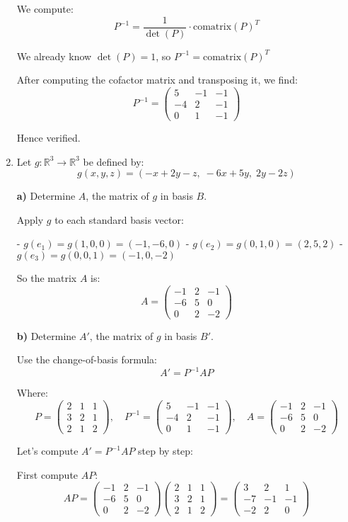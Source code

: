 \documentclass[12pt]{article}
\begin{document}
\begin{answerbox}
\begin{enumerate}
We compute:
$$
P^{-1} = \frac{1}{\det(P)} \cdot \text{comatrix}(P)^T
$$

We already know $\det(P) = 1$, so $P^{-1} = \text{comatrix}(P)^T$

After computing the cofactor matrix and transposing it, we find:
$$
P^{-1} = \begin{pmatrix}
5 & -1 & -1 \\
-4 & 2 & -1 \\
0 & 1 & -1
\end{pmatrix}
$$

Hence verified.

\item Let $g: \mathbb{R}^3 \to \mathbb{R}^3$ be defined by:
$$
g(x, y, z) = (-x + 2y - z,\; -6x + 5y,\; 2y - 2z)
$$

\textbf{a)} Determine $A$, the matrix of $g$ in basis $B$.

Apply $g$ to each standard basis vector:

- $g(e_1) = g(1,0,0) = (-1, -6, 0)$
- $g(e_2) = g(0,1,0) = (2, 5, 2)$
- $g(e_3) = g(0,0,1) = (-1, 0, -2)$

So the matrix $A$ is:
$$
A = \begin{pmatrix}
-1 & 2 & -1 \\
-6 & 5 & 0 \\
0 & 2 & -2
\end{pmatrix}
$$

\textbf{b)} Determine $A'$, the matrix of $g$ in basis $B'$.

Use the change-of-basis formula:
$$
A' = P^{-1} A P
$$

Where:
$$
P = \begin{pmatrix}
2 & 1 & 1 \\
3 & 2 & 1 \\
2 & 1 & 2
\end{pmatrix},\quad
P^{-1} = \begin{pmatrix}
5 & -1 & -1 \\
-4 & 2 & -1 \\
0 & 1 & -1
\end{pmatrix},\quad
A = \begin{pmatrix}
-1 & 2 & -1 \\
-6 & 5 & 0 \\
0 & 2 & -2
\end{pmatrix}
$$

Let's compute $A' = P^{-1} A P$ step by step:

First compute $A P$:
$$
AP = \begin{pmatrix}
-1 & 2 & -1 \\
-6 & 5 & 0 \\
0 & 2 & -2
\end{pmatrix}
\begin{pmatrix}
2 & 1 & 1 \\
3 & 2 & 1 \\
2 & 1 & 2
\end{pmatrix}
=
\begin{pmatrix}
3 & 2 & 1 \\
-7 & -1 & -1 \\
-2 & 2 & 0
\end{pmatrix}
$$


\end{enumerate}
\end{answerbox}
\end{document}
